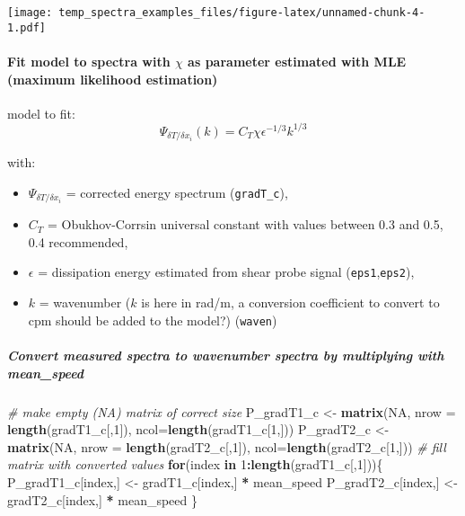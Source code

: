 \documentclass[]{article}
\newenvironment{Shaded}{\begin{snugshade}}{\end{snugshade}}
\newcommand{\KeywordTok}[1]{\textcolor[rgb]{0.13,0.29,0.53}{\textbf{#1}}}
\newcommand{\DataTypeTok}[1]{\textcolor[rgb]{0.13,0.29,0.53}{#1}}
\newcommand{\DecValTok}[1]{\textcolor[rgb]{0.00,0.00,0.81}{#1}}
\newcommand{\StringTok}[1]{\textcolor[rgb]{0.31,0.60,0.02}{#1}}
\newcommand{\CommentTok}[1]{\textcolor[rgb]{0.56,0.35,0.01}{\textit{#1}}}
\newcommand{\OtherTok}[1]{\textcolor[rgb]{0.56,0.35,0.01}{#1}}
\newcommand{\ControlFlowTok}[1]{\textcolor[rgb]{0.13,0.29,0.53}{\textbf{#1}}}
\newcommand{\OperatorTok}[1]{\textcolor[rgb]{0.81,0.36,0.00}{\textbf{#1}}}
\newcommand{\NormalTok}[1]{#1}
\providecommand{\tightlist}{%
  \setlength{\itemsep}{0pt}\setlength{\parskip}{0pt}}
\let\oldparagraph\paragraph
\renewcommand{\paragraph}[1]{\oldparagraph{#1}\mbox{}}
\let\oldsubparagraph\subparagraph
\renewcommand{\subparagraph}[1]{\oldsubparagraph{#1}\mbox{}}
\begin{document}
\texttt{[image: temp\_spectra\_examples\_files/figure-latex/unnamed-chunk-4-1.pdf]}

\paragraph{\texorpdfstring{Fit model to spectra with \(\chi\) as
parameter estimated with MLE (maximum likelihood
estimation)}{Fit model to spectra with \textbackslash{}chi as parameter estimated with MLE (maximum likelihood estimation)}}\label{fit-model-to-spectra-with-chi-as-parameter-estimated-with-mle-maximum-likelihood-estimation}

model to fit:
\[\Psi_{\delta T/\delta x_i}(k) = C_T \chi \epsilon^{-1/3} k^{1/3}\]

with:

\begin{itemize}
\tightlist
\item
  \(\Psi_{\delta T/\delta x_i}\) = corrected energy spectrum
  (\texttt{gradT\_c}),
\item
  \(C_T\) = Obukhov-Corrsin universal constant with values between 0.3
  and 0.5, 0.4 recommended,
\item
  \(\epsilon\) = dissipation energy estimated from shear probe signal
  (\texttt{eps1},\texttt{eps2}),
\item
  \(k\) = wavenumber (\(k\) is here in rad/m, a conversion coefficient
  to convert to cpm should be added to the model?) (\texttt{waven})
\end{itemize}

\subparagraph{Convert measured spectra to wavenumber spectra by
multiplying with
mean\_speed}\label{convert-measured-spectra-to-wavenumber-spectra-by-multiplying-with-mean_speed}

\begin{Shaded}
\begin{Highlighting}[]
\CommentTok{# make empty (NA) matrix of correct size}
\NormalTok{P_gradT1_c <-}\StringTok{ }\KeywordTok{matrix}\NormalTok{(}\OtherTok{NA}\NormalTok{, }\DataTypeTok{nrow =} \KeywordTok{length}\NormalTok{(gradT1_c[,}\DecValTok{1}\NormalTok{]), }\DataTypeTok{ncol=}\KeywordTok{length}\NormalTok{(gradT1_c[}\DecValTok{1}\NormalTok{,]))}
\NormalTok{P_gradT2_c <-}\StringTok{ }\KeywordTok{matrix}\NormalTok{(}\OtherTok{NA}\NormalTok{, }\DataTypeTok{nrow =} \KeywordTok{length}\NormalTok{(gradT2_c[,}\DecValTok{1}\NormalTok{]), }\DataTypeTok{ncol=}\KeywordTok{length}\NormalTok{(gradT2_c[}\DecValTok{1}\NormalTok{,]))}
\CommentTok{# fill matrix with converted values}
\ControlFlowTok{for}\NormalTok{(index }\ControlFlowTok{in} \DecValTok{1}\OperatorTok{:}\KeywordTok{length}\NormalTok{(gradT1_c[,}\DecValTok{1}\NormalTok{]))\{}
\NormalTok{  P_gradT1_c[index,] <-}\StringTok{ }\NormalTok{gradT1_c[index,] }\OperatorTok{*}\StringTok{ }\NormalTok{mean_speed}
\NormalTok{  P_gradT2_c[index,] <-}\StringTok{ }\NormalTok{gradT2_c[index,] }\OperatorTok{*}\StringTok{ }\NormalTok{mean_speed}
\NormalTok{\}}
\end{Highlighting}
\end{Shaded}
\end{document}
